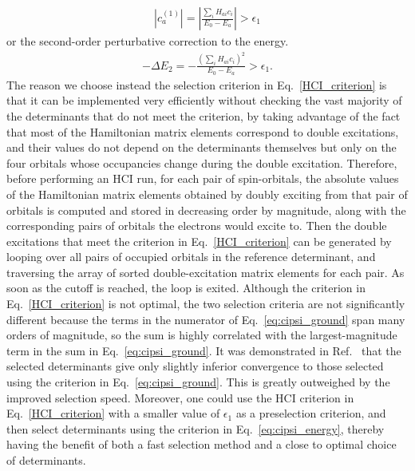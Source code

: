 \documentclass[%
preprint,
 superscriptaddress,
 amsmath,amssymb,
 aps,
]{revtex4-1}
\def\beq{\begin{eqnarray}}
\def\eeq{\end{eqnarray}}
\begin{document}
\beq
\left|c_a^{(1)}\right|=\left|\frac{\sum_i H_{ai}c_i}{E_0-E_a}\right| > \epsilon_1
\label{eq:cipsi_ground}
\eeq
or the second-order perturbative correction to the energy.
\beq
-\Delta E_2=-\frac{\left(\sum_i H_{ai}c_i\right)^2}{E_0-E_a} > \epsilon_1.
\label{eq:cipsi_energy}
\eeq
The reason we choose instead the selection criterion in Eq.~\ref{HCI_criterion} is that it can be implemented
very efficiently without checking the vast majority of the determinants that do not meet the criterion, by taking advantage
of the fact that %
most of the Hamiltonian matrix elements correspond to double excitations, and their values do not depend
on the determinants themselves but only on the four orbitals whose occupancies change during the double excitation.
Therefore, before performing an HCI run, for each pair of spin-orbitals, the absolute values of the Hamiltonian matrix elements
obtained by doubly exciting from that pair of orbitals is computed and stored
in decreasing order by magnitude, along with the corresponding pairs of orbitals the electrons would excite to.
Then the double excitations that meet the criterion in Eq.~\ref{HCI_criterion} can be generated by
looping over all pairs of occupied orbitals in the reference determinant, and
traversing the array of sorted double-excitation matrix elements for each pair.
As soon as the cutoff is reached, the loop is exited.
Although the criterion in Eq.~\ref{HCI_criterion} is not optimal, the two selection criteria are not significantly different because
the terms in the numerator of Eq.~\ref{eq:cipsi_ground}
span many orders of magnitude, so the sum is highly correlated with the largest-magnitude term in the sum in Eq.~\ref{eq:cipsi_ground}.
It was demonstrated in Ref.~\cite{HolTubUmr-JCTC-16} that the selected determinants give only slightly inferior convergence
to those selected using the criterion in Eq.~\ref{eq:cipsi_ground}.  This is greatly outweighed by the improved selection speed.
Moreover, one could use the HCI criterion in Eq.~\ref{HCI_criterion} with a smaller value of $\epsilon_1$ as a preselection criterion, and then select determinants
using the criterion in Eq.~\ref{eq:cipsi_energy}, thereby having the benefit of both a fast selection method and a
close to optimal choice of determinants.
\end{document}
